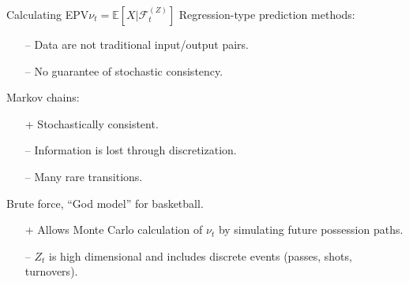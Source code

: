 \documentclass[10pt]{beamer}
\newcommand{\prob}{\mathbb{P}}                  %
\newcommand{\E}{\mathbb{E}}											%
\newcommand{\Fz}{\mathcal{F}^{(Z)}}
\begin{document}
\begin{frame}{Calculating EPV}{$\nu_t = \E[X | \Fz_t]$}
Regression-type prediction methods:
\begin{itemize}
\item[--] Data are not traditional input/output pairs.
\item[--] No guarantee of stochastic consistency.
\end{itemize}
\pause
Markov chains:
\begin{itemize}
\item[+] Stochastically consistent.
\item[--] Information is lost through discretization.
\item[--] Many rare transitions.
\end{itemize}
\pause
Brute force, ``God model'' for basketball.
\begin{itemize}
\item[+] Allows Monte Carlo calculation of $\nu_t$ by simulating future possession paths.
\item[--] $Z_t$ is high dimensional and includes discrete events (passes, shots, turnovers).
\end{itemize}
\end{frame}
\end{document}
